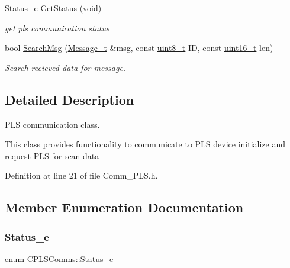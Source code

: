 \begin{DoxyCompactItemize}
\mbox{\hyperlink{class_c_p_l_s_comms_a765bc36363f75f4faf4fd2b41d440159}{Status\+\_\+e}} \mbox{\hyperlink{class_c_p_l_s_comms_a05149da99ab80b804699763111315f33}{Get\+Status}} (void)
\begin{DoxyCompactList}\small\item\em get pls communication status \end{DoxyCompactList}\item 
bool \mbox{\hyperlink{class_c_p_l_s_comms_a14754b4119b9a3d613579c2a80220cc0}{Search\+Msg}} (\mbox{\hyperlink{struct_c_p_l_s_comms_1_1_message__t}{Message\+\_\+t}} \&msg, const \mbox{\hyperlink{_a_d_a_s___types_8h_aba7bc1797add20fe3efdf37ced1182c5}{uint8\+\_\+t}} ID, const \mbox{\hyperlink{_a_d_a_s___types_8h_a1f1825b69244eb3ad2c7165ddc99c956}{uint16\+\_\+t}} len)
\begin{DoxyCompactList}\small\item\em Search recieved data for message. \end{DoxyCompactList}\end{DoxyCompactItemize}


\subsection{Detailed Description}
P\+LS communication class. 

This class provides functionality to communicate to P\+LS device initialize and request P\+LS for scan data 

Definition at line 21 of file Comm\+\_\+\+P\+L\+S.\+h.



\subsection{Member Enumeration Documentation}
\mbox{\label{class_c_p_l_s_comms_a765bc36363f75f4faf4fd2b41d440159}} 
\subsubsection{\texorpdfstring{Status\+\_\+e}{Status\_e}}
{\footnotesize\ttfamily enum \mbox{\hyperlink{class_c_p_l_s_comms_a765bc36363f75f4faf4fd2b41d440159}{C\+P\+L\+S\+Comms\+::\+Status\+\_\+e}}}



